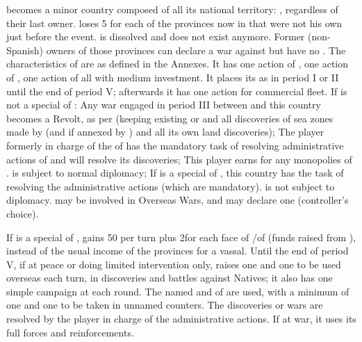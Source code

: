 
\phevnt
\aparag {}%
\paysHollande becomes a minor country composed of all its national territory:
, regardless of their last owner.  \SPA loses
5 \VP for each of the provinces now in \HOL that were not his own just before
the event. \paysprovincesne is dissolved and does not exist anymore.
\bparag Former (non-Spanish) owners of those provinces can declare a war
against \HOL but have no \CB.
\aparag The characteristics of \paysHollande are as defined in the Annexes.
It has one action of \TP, one action of \COL, one action of \CONC all with
medium investment. It places its \TradeFLEET as in period I or II until the
end of period V; afterwards it has one action for commercial fleet.
\aparag If \paysHollande is not a special \VASSAL of \SPA:
\bparag Any war engaged in period III between \SPA and this country becomes a
Revolt, as per  (keeping existing \COL
or \TP and all discoveries of sea zones made by \SPA (and \POR if annexed by
\SPA) and all its own land discoveries);
\bparag The player formerly in charge of the \TradeFLEET of \paysHollande has
the mandatory task of resolving administrative actions of \HOL and will
resolve its discoveries;
\bparag This player earns \VP for any monopolies of \paysHollande.
\bparag \paysHollande is subject to normal diplomacy;
\aparag If \paysHollande is a special \VASSAL of \SPA, this country has the
task of resolving the administrative actions (which are mandatory).
\paysHollande is not subject to diplomacy.
\aparag \paysHollande may be involved in Overseas Wars, and may declare one
(controller's choice).

\phadm
\aparag If \paysHollande is a special \VASSAL of \SPA, \SPA gains 50\ducats
per turn plus 2\ducats for each face of \COL/\TP of \paysHollande (funds
raised from \paysHollande), instead of the usual income of the provinces for a
vassal.
\aparag Until the end of period V, if at peace or doing limited intervention
only, \paysHollande raises one \FLEET\faceplus and one \ARMY\faceplus to be
used overseas each turn, in discoveries and battles against Natives; it also
has one simple campaign at each round. The named \LeaderE and \LeaderC of \HOL
are used, with a minimum of one \LeaderE and one \LeaderC to be taken in
unnamed counters. The discoveries or wars are resolved by the player in charge
of the administrative actions.
\aparag If at war, it uses its full forces and reinforcements.

